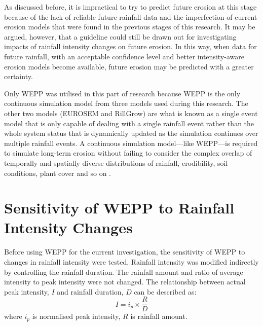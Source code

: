 As discussed before, it is impractical to try to predict future erosion at this
stage because of the lack of reliable future rainfall data and the imperfection
of current erosion models that were found in the previous stages of this
research. It may be argued, however, that a guideline could still be drawn out
for investigating impacts of rainfall intensity changes on future erosion. In
this way, when data for future rainfall, with an acceptable confidence level and
better intensity-aware erosion models become available, future erosion may be
predicted with a greater certainty.

Only WEPP was utilised in this part of research because WEPP is the only
continuous simulation model from three models used during this research. The
other two models (EUROSEM and RillGrow) are what is known as a single event
model that is only capable of dealing with a single rainfall event rather than
the whole system status that is dynamically updated as the simulation continues
over multiple rainfall events. A continuous simulation model---like WEPP---is
required to simulate long-term erosion without failing to consider the complex
overlap of temporally and spatially diverse distributions of rainfall,
erodibility, soil conditions, plant cover and so on \citep{nearing2006-145}.






\section{Sensitivity of WEPP to Rainfall Intensity Changes}
\label{sec:MethodsSensitivityOfCLIGENToRainfallIntensityChanges}

Before using WEPP for the current investigation, the sensitivity of WEPP to
changes in rainfall intensity were tested. Rainfall intensity was modified
indirectly by controlling the rainfall duration. The rainfall amount and ratio
of average intensity to peak intensity were not changed. The relationship
between actual peak intensity, $I$ and rainfall duration, $D$ can be described
as:
\begin{equation}
\label{eq:ActualIntensity}
  I = i_p \times \frac{R}{D}
\end{equation}
where $i_p$ is normalised peak intensity, $R$ is rainfall amount.

